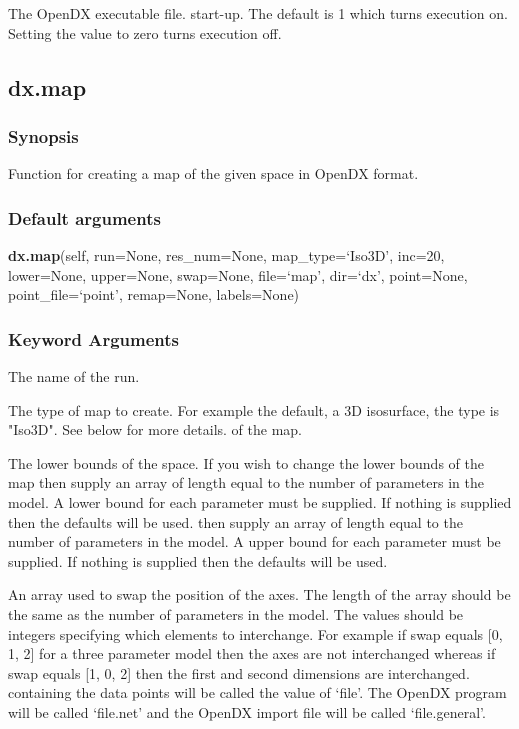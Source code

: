   The OpenDX executable file.
start-up.  The default is 1 which turns execution on.  Setting the value to zero turns
execution off.


\newpage

\subsection{dx.map}


\subsubsection{Synopsis}

Function for creating a map of the given space in OpenDX format.

\subsubsection{Default arguments}

\textsf{\textbf{dx.map}(self, run=None, res\_num=None, map\_type=`Iso3D', inc=20, lower=None, upper=None, swap=None, file=`map', dir=`dx', point=None, point\_file=`point', remap=None, labels=None)}


\subsubsection{Keyword Arguments}

  The name of the run.

  The type of map to create.  For example the default, a 3D isosurface, the type is "Iso3D".  See below for more details.
of the map.

  The lower bounds of the space.  If you wish to change the lower bounds of the map then supply an array of length equal to the number of parameters in the model.  A lower bound for each parameter must be supplied.  If nothing is supplied then the defaults will be used.
then supply an array of length equal to the number of parameters in the model.  A upper
bound for each parameter must be supplied.  If nothing is supplied then the defaults will
be used.

  An array used to swap the position of the axes.  The length of the array should be the same as the number of parameters in the model.  The values should be integers specifying which elements to interchange.  For example if swap equals [0, 1, 2] for a three parameter model then the axes are not interchanged whereas if swap equals [1, 0, 2] then the first and second dimensions are interchanged.
containing the data points will be called the value of `file'.  The OpenDX program will be
called `file.net' and the OpenDX import file will be called `file.general'.

